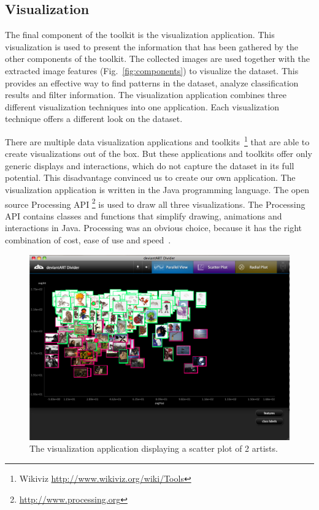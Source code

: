 \subsection{Visualization}
The final component of the toolkit is the visualization application.
This visualization is used to present the information that has been gathered by the other components of the toolkit.
The collected images are used together with the extracted image features (Fig.~\ref{fig:components}) to visualize the dataset.
This provides an effective way to find patterns in the dataset, analyze classification results and filter information.
The visualization application combines three different visualization techniques into one application.
Each visualization technique offers a different look on the dataset.

There are multiple data visualization applications and toolkits~\footnote{Wikiviz \url{http://www.wikiviz.org/wiki/Tools}} that are able to create visualizations out of the box.
But these applications and toolkits offer only generic displays and interactions, which do not capture the dataset in its full potential.
This disadvantage convinced us to create our own application.
The visualization application is written in the Java programming language.
The open source Processing API \footnote{\url{http://www.processing.org}} is used to draw all three visualizations.
The Processing API contains classes and functions that simplify drawing, animations and interactions in Java.
Processing was an obvious choice, because it has the right combination of cost, ease of use and speed~\cite{fry08}.

\begin{figure}[htb]
  \centering
  \includegraphics[width=1\linewidth]{img/visualization_scatter.png}
  \caption{The visualization application displaying a scatter plot of 2 artists.}
  \label{fig:visualization_scatter}
\end{figure}

